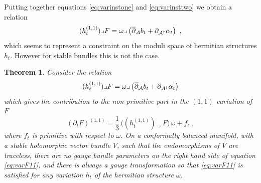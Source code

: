 \documentclass[12pt,a4paper]{article}
\def\bar#1{\overline{#1}}
\let\p=\partial
\def\bp{\bar{\partial}}
\newtheorem{Theorem}{Theorem}
\theoremstyle{definition}
\begin{document}
Putting together equations \eqref{eq:varinstone} and \eqref{eq:varinsttwo} we obtain a relation
\begin{equation*}
 (h_t^{(1,1)})\lrcorner F = \omega\lrcorner\left( \bp_{\cal A} b_t + \p_{{\cal A}^\dagger} \alpha_t\right)~,
\end{equation*}
which seems to represent a constraint on the moduli space of hermitian structures $h_t$.  However for stable bundles this is not the case.  

\begin{Theorem}\label{tm:zero}
Consider the relation 
\begin{equation}
(h_t^{(1,1)})\lrcorner F =  \omega\lrcorner\left( \bp_{\cal A} b_t + \p_{{\cal A}^\dagger} \alpha_t\right)
\label{eq:varF11}
\end{equation}
which gives the contribution to the non-primitive part in the $(1,1)$ variation of $F$
\[ (\p_t F)^{(1,1)} = \frac{1}{3}\, \big((h_t^{(1,1)})\lrcorner F\big)\, \omega + f_t~,\]
where $f_t$ is primitive with respect to $\omega$.
On a {\it conformally balanced manifold}, with a stable holomorphic vector bundle $V$, such that the endomorphisms of $V$ are traceless, there are no gauge bundle parameters on the right hand side of equation \eqref{eq:varF11}, and there is always a gauge transformation so that \eqref{eq:varF11} is satisfied for any variation $h_t$ of the hermitian structure $\omega$.
\end{Theorem}
\end{document}
